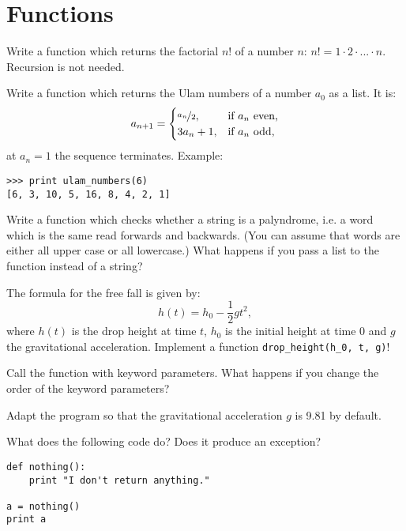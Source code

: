 \section*{Functions}
\begin{aufgabe}[Factorial]
\label{fakultaet}
Write a function which returns the factorial $n!$ of a number $n$: $n! = 1 \cdot 2 \cdot ... \cdot n$. Recursion is not needed.
\end{aufgabe}

\begin{aufgabe}
\label{ulamfolge}
Write a function which returns the Ulam numbers of a number $a_0$ as a list. It is: 
\begin{displaymath}
a_{n+1} =
\begin{cases}
\nicefrac{a_n}{2}, & \text{if } a_n \text{ even,}\\
3 a_n+1, & \text{if } a_n \text{ odd,}\\
\end{cases}
\end{displaymath}
 at $a_n=1$ the sequence terminates. 
Example: 
\begin{lstlisting}
>>> print ulam_numbers(6)
[6, 3, 10, 5, 16, 8, 4, 2, 1]
\end{lstlisting}
\end{aufgabe}

\begin{aufgabe}[Palindrome]
\label{palindrom}
Write a function which checks whether a string is a palyndrome, i.e. a word which is the same read forwards and backwards. (You can assume that words are either all upper case or all lowercase.) What happens if you pass a list to the function instead of a string?
\end{aufgabe}

\begin{aufgabe}
\label{freier_fall}
The formula for the free fall is given by:
\begin{displaymath}
h(t) = h_0 - \frac{1}{2} gt^2, 
\end{displaymath}
where $h(t)$ is the drop height at time $t$, $h_0$ is the initial height at time 0 and $g$ the gravitational acceleration. Implement a function \lstinline{drop_height(h_0, t, g)}!
\begin{teilaufgabe}
Call the function with keyword parameters. What happens if you change the order of the keyword parameters?
\end{teilaufgabe}
\begin{teilaufgabe}
Adapt the program so that the gravitational acceleration $g$ is 9.81 by default.
\end{teilaufgabe}
\end{aufgabe}

\begin{aufgabe}
What does the following code do? Does it produce an exception?
\begin{lstlisting}
def nothing():
    print "I don't return anything."

a = nothing()
print a
\end{lstlisting}
\end{aufgabe}



